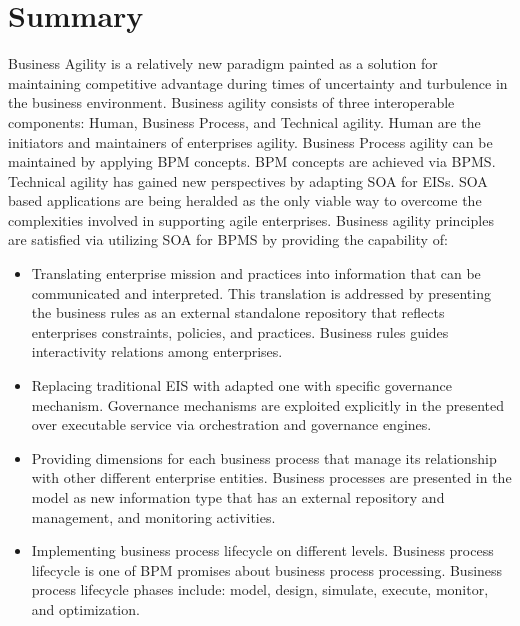 \documentclass[12pt,a4paper,final,twoside,onecolumn,titlepage]{book}
\begin{document}
\section{Summary}
Business Agility is a relatively new paradigm painted as a solution for maintaining competitive advantage during times of uncertainty and turbulence in the business environment. Business agility consists of three interoperable components: Human, Business Process, and Technical agility. Human are the initiators and maintainers of enterprises agility. Business Process agility can be maintained by applying \gls{BPM} concepts. \gls{BPM} concepts are achieved via \gls{BPMS}. Technical agility has gained new perspectives by adapting \gls{SOA} for \gls{EIS}s.  \gls{SOA} based applications are being heralded as the only viable way to overcome the complexities involved in supporting agile enterprises. Business agility principles are satisfied via utilizing \gls{SOA} for \gls{BPMS} by providing the capability of:
\begin{itemize}
\item Translating enterprise mission and practices into information that can be communicated and interpreted. This translation is addressed by presenting the business rules as an external standalone repository that reflects enterprises constraints, policies, and practices. Business rules guides interactivity relations among enterprises.   
\item Replacing traditional \gls{EIS} with adapted one with specific governance mechanism. Governance mechanisms are exploited explicitly in the presented over executable service via orchestration and governance engines.
\item Providing dimensions for each business process that manage its relationship with other different enterprise entities. Business processes are presented in the model as new information type that has an external repository and management, and monitoring activities.
\item Implementing business process lifecycle on different levels. Business process lifecycle is one of \gls{BPM} promises about business process processing. Business process lifecycle phases include: model, design, simulate, execute, monitor, and optimization.
\end{itemize}
\end{document}

